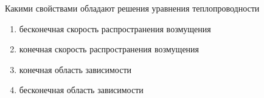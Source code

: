 Какими свойствами обладают решения уравнения теплопроводности

\begin{enumerate}[label=\arabic*)]
    \item бесконечная скорость распространения возмущения
    \item конечная скорость распространения возмущения
    \item конечная область зависимости
    \item бесконечная область зависимости
\end{enumerate}

